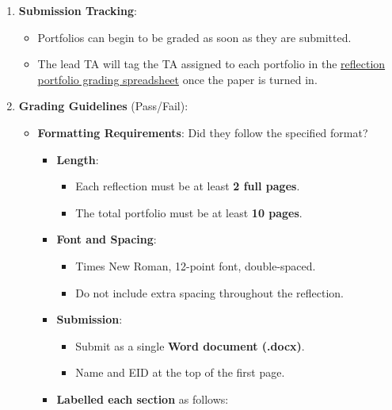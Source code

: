 \documentclass[
]{article}
\providecommand{\tightlist}{%
  \setlength{\itemsep}{0pt}\setlength{\parskip}{0pt}}
\begin{document}
\begin{enumerate}
\def\labelenumi{\arabic{enumi}.}
\item
  \textbf{Submission Tracking}:

  \begin{itemize}
  \tightlist
  \item
    Portfolios can begin to be graded as soon as they are submitted.\\
  \item
    The lead TA will tag the TA assigned to each portfolio in the \href{https://docs.google.com/spreadsheets/d/1tOP3nKaxPEMGZprCt2eqzTt-4ICCyVoQgQQBqT2EKrE/edit?gid=1778739291\#gid=1778739291}{reflection portfolio grading spreadsheet} once the paper is turned in.
  \end{itemize}
\item
  \textbf{Grading Guidelines} (Pass/Fail):

  \begin{itemize}
  \tightlist
  \item
    \textbf{Formatting Requirements}: Did they follow the specified format?

    \begin{itemize}
    \tightlist
    \item
      \textbf{Length}:

      \begin{itemize}
      \tightlist
      \item
        Each reflection must be at least \textbf{2 full pages}.\\
      \item
        The total portfolio must be at least \textbf{10 pages}.\\
      \end{itemize}
    \item
      \textbf{Font and Spacing}:

      \begin{itemize}
      \tightlist
      \item
        Times New Roman, 12-point font, double-spaced.\\
      \item
        Do not include extra spacing throughout the reflection.\\
      \end{itemize}
    \item
      \textbf{Submission}:

      \begin{itemize}
      \tightlist
      \item
        Submit as a single \textbf{Word document (.docx)}.\\
      \item
        Name and EID at the top of the first page.\\
      \end{itemize}
    \item
      \textbf{Labelled each section} as follows:


\end{itemize}
\end{itemize}
\end{enumerate}
\end{document}
